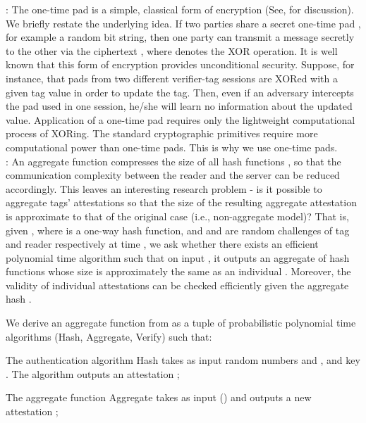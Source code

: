 \documentclass{easychair}
\begin{document}
: The one-time pad is a simple, classical form of encryption (See, \cite{menezes} for 
discussion). We briefly restate the underlying idea. If two parties share a secret one-time pad , for example a
 random bit string, then one party can transmit a message  secretly to the other via the ciphertext ,
  where  denotes the XOR operation. It is well known that this form of encryption provides unconditional 
  security. Suppose, for instance, that pads from two different verifier-tag sessions are XORed with a given tag
value in order to update the tag. Then, even if an adversary intercepts the pad used in one session, he/she will learn 
no information about the updated value. Application of a one-time pad requires only the lightweight computational 
process of XORing. The standard cryptographic primitives require 
more computational power than one-time pads. This is why we use one-time pads.\\
: An aggregate function compresses the size of all hash functions , so that the 
communication complexity between the reader and the server can be reduced accordingly. This leaves an interesting 
research problem - is it possible to aggregate tags' attestations so that the size of the resulting aggregate 
attestation is approximate to that of the original case (i.e., non-aggregate model)? 
That is, given , where  is a one-way hash function, 
and  and  are random challenges of tag and reader respectively at time , we ask whether 
there exists an efficient polynomial time algorithm such that on input ,
 it outputs an aggregate of hash functions  whose size is approximately 
 the same as an individual . Moreover, the validity of individual attestations can be checked efficiently 
 given the aggregate hash .

We derive an aggregate function from \cite{zhu} as a tuple of probabilistic polynomial time algorithms 
(Hash, Aggregate, Verify) such that:

The authentication algorithm Hash takes as input random numbers  and , and key . 
The algorithm outputs an attestation ;

The aggregate function Aggregate takes as input () and outputs a new attestation ;
\end{document}

